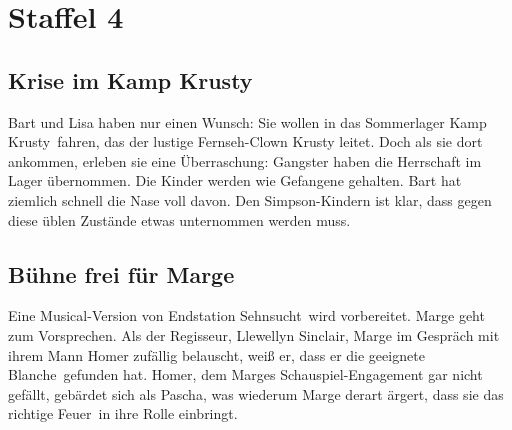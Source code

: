\section{Staffel 4}

\subsection{Krise im Kamp Krusty}\label{8F24}
Bart und Lisa haben nur einen Wunsch: Sie wollen in das Sommerlager \glqq Kamp Krusty\grqq\ fahren, das der lustige Fernseh-Clown Krusty leitet. Doch als sie dort ankommen, erleben sie eine Überraschung: Gangster haben die Herrschaft im Lager übernommen. Die Kinder werden wie Gefangene gehalten. Bart hat ziemlich schnell die Nase voll davon. Den Simpson-Kindern ist klar, dass gegen diese üblen Zustände etwas unternommen werden muss.


	
\subsection{Bühne frei für Marge}\label{8F18}
Eine Musical-Version von \glqq Endstation Sehnsucht\grqq\ wird vorbereitet. Marge geht zum Vorsprechen. Als der Regisseur, Llewellyn Sinclair, Marge im Gespräch mit ihrem Mann Homer zufällig belauscht, weiß er, dass er die geeignete \glqq Blanche\grqq\ gefunden hat. Homer, dem Marges Schauspiel-Engagement gar nicht gefällt, gebärdet sich als Pascha, was wiederum Marge derart ärgert, dass sie das richtige \glqq Feuer\grqq\ in ihre Rolle einbringt.

